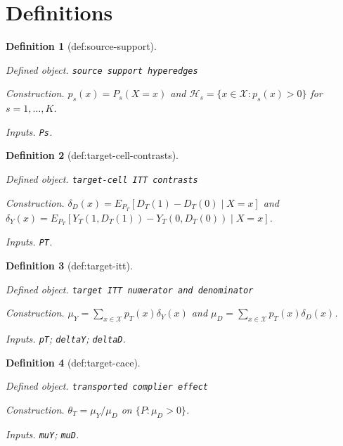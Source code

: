\documentclass{article}
\newtheorem{definition}{Definition}
\begin{document}
\section{Definitions}

\begin{definition}[def:source-support]\label{def:source-support}
\par\smallskip\noindent\emph{Defined object.} \texttt{source support hyperedges}
\par\smallskip\noindent\emph{Construction.} \(p_s(x)=P_s(X=x)\) and \(\mathcal H_s=\{x\in\mathcal X:p_s(x)>0\}\) for \(s=1,\ldots,K\).
\par\smallskip\noindent\emph{Inputs.} \texttt{Ps}.
\end{definition}

\begin{definition}[def:target-cell-contrasts]\label{def:target-cell-contrasts}
\par\smallskip\noindent\emph{Defined object.} \texttt{target-\allowbreak{}cell ITT contrasts}
\par\smallskip\noindent\emph{Construction.} \(\delta_D(x)=E_{P_T}[D_T(1)-D_T(0)\mid X=x]\) and \(\delta_Y(x)=E_{P_T}[Y_T(1,D_T(1))-Y_T(0,D_T(0))\mid X=x]\).
\par\smallskip\noindent\emph{Inputs.} \texttt{PT}.
\end{definition}

\begin{definition}[def:target-itt]\label{def:target-itt}
\par\smallskip\noindent\emph{Defined object.} \texttt{target ITT numerator and denominator}
\par\smallskip\noindent\emph{Construction.} \(\mu_Y=\sum_{x\in\mathcal X}p_T(x)\delta_Y(x)\) and \(\mu_D=\sum_{x\in\mathcal X}p_T(x)\delta_D(x)\).
\par\smallskip\noindent\emph{Inputs.} \texttt{pT}; \texttt{deltaY}; \texttt{deltaD}.
\end{definition}

\begin{definition}[def:target-cace]\label{def:target-cace}
\par\smallskip\noindent\emph{Defined object.} \texttt{transported complier effect}
\par\smallskip\noindent\emph{Construction.} \(\theta_T=\mu_Y/\mu_D\) on \(\{P:\mu_D>0\}\).
\par\smallskip\noindent\emph{Inputs.} \texttt{muY}; \texttt{muD}.
\end{definition}
\end{document}
